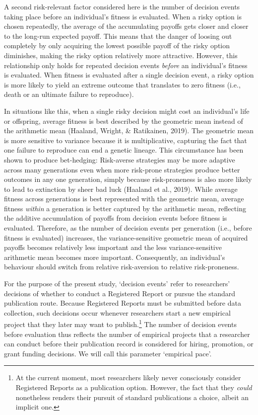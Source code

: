 \documentclass[
  british,
  a4paper,
  ,man,mask,floatsintext]{apa6}
\begin{document}
A second risk-relevant factor considered here is the number of decision events taking place before an individual's fitness is evaluated.
When a risky option is chosen repeatedly, the average of the accumulating payoffs gets closer and closer to the long-run expected payoff.
This means that the danger of loosing out completely by only acquiring the lowest possible payoff of the risky option diminishes, making the risky option relatively more attractive.
However, this relationship only holds for repeated decision events \emph{before} an individual's fitness is evaluated.
When fitness is evaluated after a single decision event, a risky option is more likely to yield an extreme outcome that translates to zero fitness (i.e., death or an ultimate failure to reproduce).

In situations like this, when a single risky decision might cost an individual's life or offspring, average fitness is best described by the geometric mean instead of the arithmetic mean (Haaland, Wright, \& Ratikainen, 2019).
The geometric mean is more sensitive to variance because it is multiplicative, capturing the fact that one failure to reproduce can end a genetic lineage.
This circumstance has been shown to produce bet-hedging:
Risk-averse strategies may be more adaptive across many generations even when more risk-prone strategies produce better outcomes in any one generation, simply because risk-proneness is also more likely to lead to extinction by sheer bad luck (Haaland et al., 2019).
While average fitness across generations is best represented with the geometric mean, average fitness \emph{within} a generation is better captured by the arithmetic mean, reflecting the additive accumulation of payoffs from decision events before fitness is evaluated.
Therefore, as the number of decision events per generation (i.e., before fitness is evaluated) increases, the variance-sensitive geometric mean of acquired payoffs becomes relatively less important and the less variance-sensitive arithmetic mean becomes more important.
Consequently, an individual's behaviour should switch from relative risk-aversion to relative risk-proneness.

For the purpose of the present study, `decision events' refer to researchers' decisions of whether to conduct a Registered Report or pursue the standard publication route.
Because Registered Reports must be submitted before data collection, such decisions occur whenever researchers start a new empirical project that they later may want to publish.\footnote{At the current moment, most researchers likely never consciously consider Registered Reports as a publication option. However, the fact that they \emph{could} nonetheless renders their pursuit of standard publications a choice, albeit an implicit one.}
The number of decision events before evaluation thus reflects the number of empirical projects that a researcher can conduct before their publication record is considered for hiring, promotion, or grant funding decisions.
We will call this parameter `empirical pace'.
\end{document}
